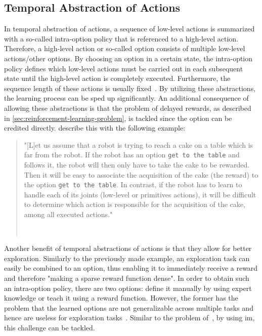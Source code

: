 \documentclass[draft,final]{vutinfth} %
\newcommand{\p}[1]{see p. #1}
\begin{document}
    \subsection{Temporal Abstraction of Actions}\label{subsec:temporal-abstraction-of-actions}

    In temporal abstraction of actions, a sequence of low-level actions is summarized with a so-called intra-option policy that is referenced to a high-level action.
    Therefore, a high-level action or so-called option consists of multiple low-level actions/other options.
    By choosing an option in a certain state, the intra-option policy defines which low-level actions must be carried out in each subsequent state until the high-level action is completely executed.
    Furthermore, the sequence length of these actions is usually fixed~\citep{aubret_survey_2019}.
    By utilizing these abstractions, the learning process can be sped up significantly.
    An additional consequence of allowing these abstractions is that the problem of delayed rewards, as described in \autoref{sec:reinforcement-learning-problem}, is tackled since the option can be credited directly.
    \citeauthor{aubret_survey_2019} describe this with the following example:

    \begin{quote}
        "[L]et us assume that a robot is trying to reach a cake on a table which is far from the robot.
        If the robot has an option \texttt{get to the table} and follows it, the robot will then only have to take the cake to be rewarded.
        Then it will be easy to associate the acquisition of the cake (the reward) to the option \texttt{get to the table}.
        In contrast, if the robot has to learn to handle each of its joints (low-level or primitives actions), it will be difficult to determine which action is responsible for the acquisition of the cake, among all executed actions."

        \hfill~\cite[\p{5f}]{aubret_survey_2019}
    \end{quote}

    Another benefit of temporal abstractions of actions is that they allow for better exploration.
    Similarly to the previously made example, an exploration task can easily be combined to an option, thus enabling it to immediately receive a reward and therefore "making a sparse reward function dense".
    In order to obtain such an intra-option policy, there are two options: define it manually by using expert knowledge or teach it using a reward function.
    However, the former has the problem that the learned options are not generalizable across multiple tasks and hence are useless for exploration tasks~\citep{aubret_survey_2019}.
    Similar to the problem of~, by using \gls{im}, this challenge can be tackled.
\end{document}
